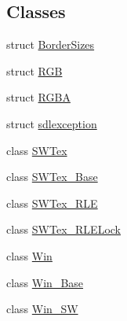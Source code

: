 \subsection*{Classes}
\begin{DoxyCompactItemize}
\item 
struct \mbox{\hyperlink{structrolmodl_1_1_border_sizes}{Border\+Sizes}}
\item 
struct \mbox{\hyperlink{structrolmodl_1_1_r_g_b}{R\+GB}}
\item 
struct \mbox{\hyperlink{structrolmodl_1_1_r_g_b_a}{R\+G\+BA}}
\item 
struct \mbox{\hyperlink{structrolmodl_1_1sdlexception}{sdlexception}}
\item 
class \mbox{\hyperlink{classrolmodl_1_1_s_w_tex}{S\+W\+Tex}}
\item 
class \mbox{\hyperlink{classrolmodl_1_1_s_w_tex___base}{S\+W\+Tex\+\_\+\+Base}}
\item 
class \mbox{\hyperlink{classrolmodl_1_1_s_w_tex___r_l_e}{S\+W\+Tex\+\_\+\+R\+LE}}
\item 
class \mbox{\hyperlink{classrolmodl_1_1_s_w_tex___r_l_e_lock}{S\+W\+Tex\+\_\+\+R\+L\+E\+Lock}}
\item 
class \mbox{\hyperlink{classrolmodl_1_1_win}{Win}}
\item 
class \mbox{\hyperlink{classrolmodl_1_1_win___base}{Win\+\_\+\+Base}}
\item 
class \mbox{\hyperlink{classrolmodl_1_1_win___s_w}{Win\+\_\+\+SW}}
\end{DoxyCompactItemize}
